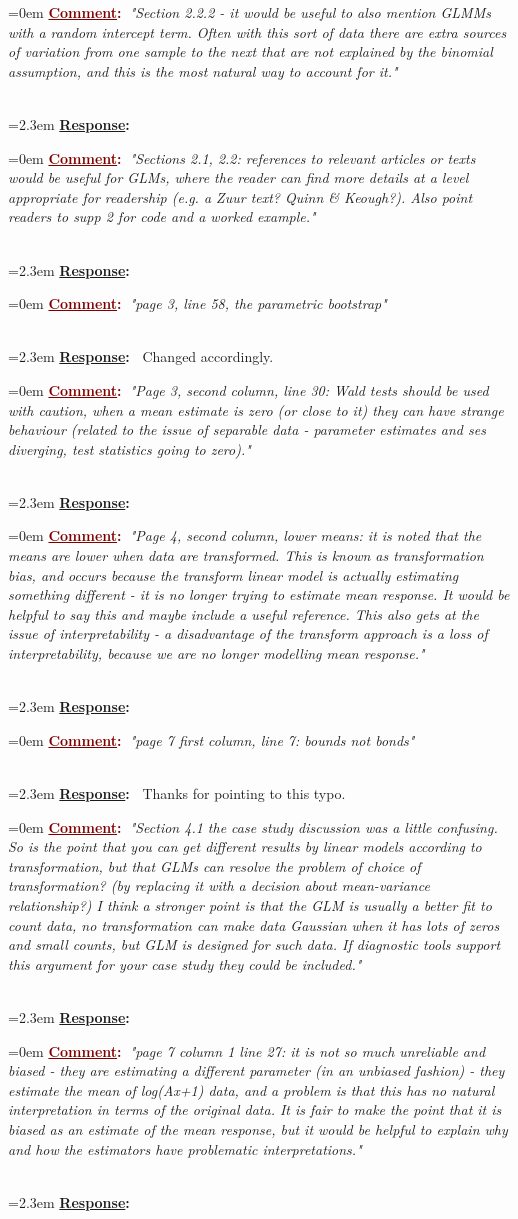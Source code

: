 \documentclass[12pt]{article}
\newcommand{\comment}[1]{
	\vspace{2em} \noindent \hangindent=0em \textbf{\textcolor{Maroon}{\uline{Comment}:~}}\emph{"#1"}
	}
\newcommand{\response}[1]{
	\\[0.25em] 
	\hangindent=2.3em \textbf{\textcolor{NavyBlue}{\uline{Response}:~}}#1 
	}
\begin{document}
\comment{Section 2.2.2 - it would be useful to also mention GLMMs with a random intercept term.  Often with this sort of data there are extra sources of variation from one sample to the next that are not explained by the binomial assumption, and this is the most natural way to account for it.}
\response{}

\comment{Sections 2.1, 2.2: references to relevant articles or texts would be useful for GLMs, where the reader can find more details at a level appropriate for readership (e.g. a Zuur text?  Quinn \& Keough?).  Also point readers to supp 2 for code and a worked example.}
\response{}

\comment{page 3, line 58, the parametric bootstrap}
\response{} Changed accordingly.

\comment{Page 3, second column, line 30: Wald tests should be used with caution, when a mean estimate is zero (or close to it) they can have strange behaviour (related to the issue of separable data - parameter estimates and ses diverging, test statistics going to zero).}
\response{}

\comment{Page 4, second column, lower means: it is noted that the means are lower when data are transformed.  This is known as transformation bias, and occurs because the transform linear model is actually estimating something different - it is no longer trying to estimate mean response.  It would be helpful to say this and maybe include a useful reference.  This also gets at the issue of interpretability - a disadvantage of the transform approach is a loss of interpretability, because we are no longer modelling mean response.}
\response{}

\comment{page 7 first column, line 7: bounds not bonds}
\response{} Thanks for pointing to this typo.

\comment{Section 4.1 the case study discussion was a little confusing.  So is the point that you can get different results by linear models according to transformation, but that GLMs can resolve the problem of choice of transformation?  (by replacing it with a decision about mean-variance relationship?)  I think a stronger point is that the GLM is usually a better fit to count data, no transformation can make data Gaussian when it has lots of zeros and small counts, but GLM is designed for such data.  If diagnostic tools support this argument for your case study they could be included.}
\response{}

\comment{page 7 column 1 line 27: it is not so much unreliable and biased - they are estimating a different parameter (in an unbiased fashion) - they estimate the mean of log(Ax+1) data, and a problem is that this has no natural interpretation in terms of the original data.  It is fair to make the point that it is biased as an estimate of the mean response, but it would be helpful to explain why and how the estimators have problematic interpretations.}
\response{}
\end{document}
